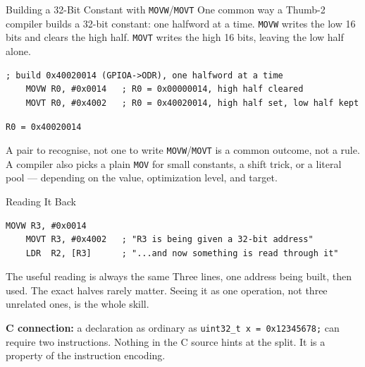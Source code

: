 \documentclass[9pt,aspectratio=169,xcolor=table]{beamer}
\begin{document}
\begin{frame}[fragile]{Building a 32-Bit Constant with \texttt{MOVW}/\texttt{MOVT}}
    \leavevmode
    {\small One common way a Thumb-2 compiler builds a 32-bit constant:
    one halfword at a time. \texttt{MOVW} writes the low 16 bits and
    clears the high half. \texttt{MOVT} writes the high 16 bits, leaving
    the low half alone.}

    \vspace{2mm}
    \begin{center}
    \begin{lstlisting}[style=armasm, language=ARM, basicstyle=\footnotesize\ttfamily]
; build 0x40020014 (GPIOA->ODR), one halfword at a time
	MOVW R0, #0x0014   ; R0 = 0x00000014, high half cleared
	MOVT R0, #0x4002   ; R0 = 0x40020014, high half set, low half kept
    \end{lstlisting}
    \end{center}

    \vspace{2mm}
    \begin{center}
        \large\texttt{R0 = 0x40020014}
    \end{center}

    \vspace{2mm}
    \begin{block}{A pair to recognise, not one to write}
        {\small \texttt{MOVW}/\texttt{MOVT} is a \alert{common outcome},
        not a rule. A compiler also picks a plain \texttt{MOV} for small
        constants, a shift trick, or a literal pool --- depending on the
        value, optimization level, and target.}
    \end{block}
\end{frame}

\begin{frame}[fragile]{Reading It Back}
    \leavevmode
    \begin{center}
    \begin{lstlisting}[style=armasm, language=ARM, basicstyle=\normalsize\ttfamily]
	MOVW R3, #0x0014
	MOVT R3, #0x4002   ; "R3 is being given a 32-bit address"
	LDR  R2, [R3]      ; "...and now something is read through it"
    \end{lstlisting}
    \end{center}

    \vspace{3mm}
    \begin{block}{The useful reading is always the same}
        Three lines, \alert{one address being built, then used}. The exact
        halves rarely matter. Seeing it as one operation, not three
        unrelated ones, is the whole skill.
    \end{block}

    \vspace{3mm}
    {\small \textbf{C connection:} a declaration as ordinary as
    \texttt{uint32\_t x = 0x12345678;} can require two instructions.
    Nothing in the C source hints at the split. It is a property of the
    \alert{instruction encoding}.}
\end{frame}
\end{document}
